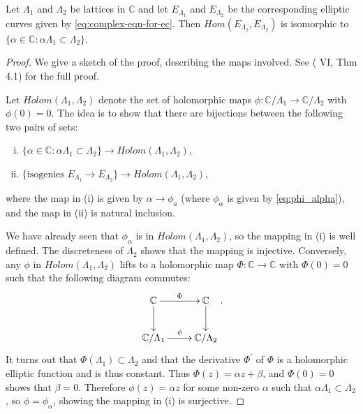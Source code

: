 \begin{prop}
  \label{prop:complex-isogenies}
  Let $\Lambda_{1}$ and $\Lambda_{2}$ be lattices in $\mathbb{C}$ and let
  $E_{\Lambda_{1}}$ and $E_{\Lambda_{2}}$ be the corresponding elliptic curves given
  by \eqref{eq:complex-eqn-for-ec}.  Then $Hom(E_{\Lambda_{1}},E_{\Lambda_{2}})$ is
  isomorphic to $\{\alpha \in \mathbb{C} \colon \alpha\Lambda_{1} \subset
  \Lambda_{2}\}$.
\end{prop}
\begin{proof}
  We give a sketch of the proof, describing the maps involved. See
  (\cite{silverman86} VI, Thm 4.1) for the full proof.

  Let $Holom(\Lambda_{1},\Lambda_{2})$ denote the set of holomorphic maps $\phi :
  \mathbb{C} / \Lambda_{1} \rightarrow \mathbb{C} / \Lambda_{2}$ with $\phi (0) = 0$.
  The idea is to show that there are bijections between the following two pairs of
  sets:
  \begin{enumerate}[(i)]
  \item $\{ \alpha \in \mathbb{C} : \alpha \Lambda_{1} \subset \Lambda_{2} \}
    \rightarrow Holom(\Lambda_{1},\Lambda_{2})$,
  \item $\{ \text{isogenies } E_{\Lambda_{1}} \rightarrow E_{\Lambda_{2}} \}
    \rightarrow Holom(\Lambda_{1},\Lambda_{2})$,

   \end{enumerate}
   where the map in (i) is given by $\alpha \rightarrow \phi_{a}$ (where
   $\phi_{\alpha}$ is given by \eqref{eq:phi_alpha}), and the map in (ii) is natural
   inclusion.

   We have already seen that $\phi_{\alpha}$ is in $Holom(\Lambda_{1},\Lambda_{2})$,
   so the mapping in (i) is well defined. The discreteness of $\Lambda_{2}$ shows
   that the mapping is injective. Conversely, any $\phi$ in
   $Holom(\Lambda_{1},\Lambda_{2})$ lifts to a holomorphic map $\Phi : \mathbb{C}
   \rightarrow \mathbb{C}$ with $\Phi (0) = 0$ such that the following diagram
   commutes:
   \begin{equation*}
     \xymatrix{
       \mathbb{C} \ar[d] \ar[r]^{\Phi} & \mathbb{C}  \ar[d]\\
       \mathbb{C} / \Lambda_{1} \ar[r]^{\phi }& \mathbb{C} / \Lambda_{2}
     }.
   \end{equation*}
   It turns out that $\Phi (\Lambda_{1}) \subset \Lambda_{2}$ and that the derivative
   $\Phi^{\prime}$ of $\Phi$ is a holomorphic elliptic function and is thus constant.
   Thus $\Phi (z) = \alpha z + \beta$, and $\Phi (0) = 0$ shows that $\beta = 0$.
   Therefore $\phi (z) = \alpha z$ for some non-zero $\alpha$ such that $\alpha
   \Lambda_{1} \subset \Lambda_{2}$, so $\phi = \phi_{\alpha}$, showing the mapping
   in (i) is surjective.


\end{proof}
